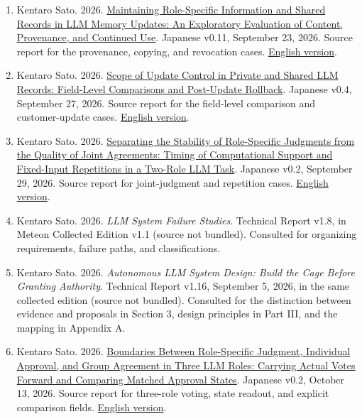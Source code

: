\documentclass[10pt,a4paper]{article}
\begin{document}
\begin{enumerate}
\def\labelenumi{\arabic{enumi}.}
\item
  Kentaro Sato. 2026. \href{https://github.com/metaSATOKEN/MRSI/blob/9443de315d283874df0c27e0e99b8c04f400709d/papers/paper-01/MRSI_Paper1-ja-v1.0.md}{Maintaining Role-Specific Information and Shared Records in LLM Memory Updates: An Exploratory Evaluation of Content, Provenance, and Continued Use}. Japanese v0.11, September 23, 2026. Source report for the provenance, copying, and revocation cases. \href{https://github.com/metaSATOKEN/MRSI/blob/9443de315d283874df0c27e0e99b8c04f400709d/papers/paper-01/MRSI_Paper1-en-v1.0.md}{English version}.
\item
  Kentaro Sato. 2026. \href{https://github.com/metaSATOKEN/MRSI/blob/9443de315d283874df0c27e0e99b8c04f400709d/papers/paper-02/MRSI_Paper2-ja-v1.0.md}{Scope of Update Control in Private and Shared LLM Records: Field-Level Comparisons and Post-Update Rollback}. Japanese v0.4, September 27, 2026. Source report for the field-level comparison and customer-update cases. \href{https://github.com/metaSATOKEN/MRSI/blob/9443de315d283874df0c27e0e99b8c04f400709d/papers/paper-02/MRSI_Paper2-en-v1.0.md}{English version}.
\item
  Kentaro Sato. 2026. \href{https://github.com/metaSATOKEN/MRSI/blob/9443de315d283874df0c27e0e99b8c04f400709d/papers/paper-03/MRSI_Paper3-ja-v1.0.md}{Separating the Stability of Role-Specific Judgments from the Quality of Joint Agreements: Timing of Computational Support and Fixed-Input Repetitions in a Two-Role LLM Task}. Japanese v0.2, September 29, 2026. Source report for joint-judgment and repetition cases. \href{https://github.com/metaSATOKEN/MRSI/blob/9443de315d283874df0c27e0e99b8c04f400709d/papers/paper-03/MRSI_Paper3-en-v1.0.md}{English version}.
\item
  Kentaro Sato. 2026. \emph{LLM System Failure Studies}. Technical Report v1.8, in Meteon Collected Edition v1.1 (source not bundled). Consulted for organizing requirements, failure paths, and classifications.
\item
  Kentaro Sato. 2026. \emph{Autonomous LLM System Design: Build the Cage Before Granting Authority}. Technical Report v1.16, September 5, 2026, in the same collected edition (source not bundled). Consulted for the distinction between evidence and proposals in Section 3, design principles in Part III, and the mapping in Appendix A.
\item
  Kentaro Sato. 2026. \href{https://github.com/metaSATOKEN/MRSI/blob/9443de315d283874df0c27e0e99b8c04f400709d/papers/paper-04/MRSI_Paper4-ja-v1.0.md}{Boundaries Between Role-Specific Judgment, Individual Approval, and Group Agreement in Three LLM Roles: Carrying Actual Votes Forward and Comparing Matched Approval States}. Japanese v0.2, October 13, 2026. Source report for three-role voting, state readout, and explicit comparison fields. \href{https://github.com/metaSATOKEN/MRSI/blob/9443de315d283874df0c27e0e99b8c04f400709d/papers/paper-04/MRSI_Paper4-en-v1.0.md}{English version}.
\end{enumerate}
\end{document}

